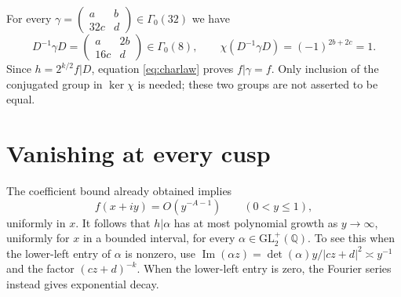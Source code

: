 \documentclass[11pt]{article}
\theoremstyle{remark}
\begin{document}
For every $\gamma=\left(\begin{smallmatrix}a&b\\32c&d\end{smallmatrix}\right)
\in\Gamma_0(32)$ we have
\[
 D^{-1}\gamma D=\begin{pmatrix}a&2b\\16c&d\end{pmatrix}
 \in\Gamma_0(8),\qquad
 \chi(D^{-1}\gamma D)=(-1)^{2b+2c}=1.
\]
Since $h=2^{k/2}f|D$, equation \eqref{eq:charlaw} proves
$f|\gamma=f$. Only inclusion of the conjugated group in
$\ker\chi$ is needed; these two groups are not asserted to be equal.

\section{Vanishing at every cusp}

The coefficient bound already obtained implies
\[
 f(x+iy)=O(y^{-A-1})\qquad(0<y\leq1),
\]
uniformly in $x$. It follows that $h|\alpha$ has at most polynomial
growth as $y\to\infty$, uniformly for $x$ in a bounded interval,
for every $\alpha\in\mathrm{GL}_2^+(\mathbb Q)$. To see this when
the lower-left entry of $\alpha$ is nonzero, use
$\operatorname{Im}(\alpha z)=\det(\alpha)y/|cz+d|^2\asymp y^{-1}$
and the factor $(cz+d)^{-k}$. When the lower-left entry is zero,
the Fourier series instead gives exponential decay.
\end{document}
